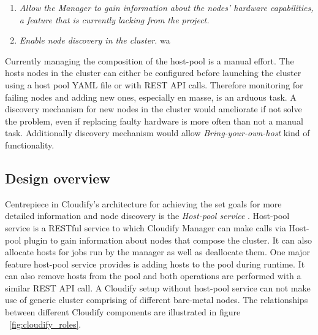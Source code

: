 \begin{enumerate}
\item \textit{Allow the Manager to gain information about the nodes' hardware capabilities, a feature that is currently lacking from the project.}
\item \textit{Enable node discovery in the cluster.}
wa\end{enumerate}

Currently managing the composition of the host-pool is a manual effort. The hosts nodes in the cluster can either be configured before launching the cluster using a host pool YAML file or with REST API calls. Therefore monitoring for failing nodes and adding new ones, especially en masse, is an arduous task. A discovery mechanism for new nodes in the cluster would ameliorate if not solve the problem, even if replacing faulty hardware is more often than not a manual task. Additionally discovery mechanism would allow \textit{Bring-your-own-host} kind of functionality.

 \subsection{Design overview}
 
 Centrepiece in Cloudify's architecture for achieving the set goals for more detailed information and node discovery is the \textit{Host-pool service} \cite{host-pool-service}. Host-pool service is a RESTful service to which Cloudify Manager can make calls via Host-pool plugin to gain information about nodes that compose the cluster. It can also allocate hosts for jobs run by the manager as well as deallocate them. One major feature host-pool service provides is adding hosts to the pool during runtime. It can also remove hosts from the pool and both operations are performed with a similar REST API call. A Cloudify setup without host-pool service can not make use of generic cluster comprising of different bare-metal nodes. The relationships between different Cloudify components are illustrated in figure ~\ref{fig:cloudify_roles}.
 
